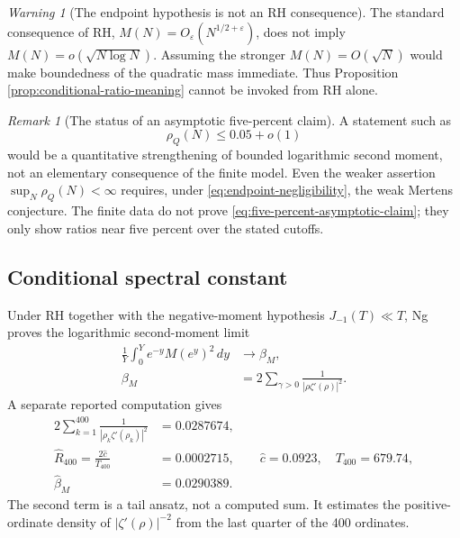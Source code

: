 \documentclass[11pt,reqno]{amsart}
\numberwithin{equation}{section}
\theoremstyle{plain}
\theoremstyle{definition}
\theoremstyle{remark}
\newtheorem{remark}[theorem]{Remark}
\newtheorem{warning}[theorem]{Warning}
\newcommand{\eps}{\varepsilon}
\begin{document}
\begin{warning}[The endpoint hypothesis is not an RH consequence]
\label{warn:endpoint-hypothesis}
The standard consequence of RH,
\(M(N)=O_{\eps}(N^{1/2+\eps})\), does not imply
\(M(N)=o(\sqrt{N\log N})\).  Assuming the stronger
\(M(N)=O(\sqrt N)\) would make boundedness of the quadratic mass immediate.
Thus Proposition \ref{prop:conditional-ratio-meaning} cannot be invoked from
RH alone.
\end{warning}

\begin{remark}[The status of an asymptotic five-percent claim]
\label{rem:always-five-percent}
A statement such as
\begin{equation}
\rho_Q(N)\leq0.05+o(1)
\label{eq:five-percent-asymptotic-claim}
\end{equation}
would be a quantitative strengthening of bounded logarithmic second moment,
not an elementary consequence of the finite model.  Even the weaker
assertion \(\sup_N\rho_Q(N)<\infty\) requires, under
\eqref{eq:endpoint-negligibility}, the weak Mertens conjecture.  The finite
data do not prove \eqref{eq:five-percent-asymptotic-claim}; they only show
ratios near five percent over the stated cutoffs.
\end{remark}

\subsection{Conditional spectral constant}
\label{subsec:spectral-constant}

Under RH together with the negative-moment hypothesis
\(J_{-1}(T)\ll T\), Ng proves the logarithmic second-moment limit
\cite{Ng2004}
\begin{align}
\frac1Y\int_0^Y e^{-y}M(e^y)^2\,dy
&\longrightarrow\beta_M,
\label{eq:ng-second-moment}\\
\beta_M
&=2\sum_{\gamma>0}\frac1{|\rho\zeta'(\rho)|^2}.
\label{eq:ng-spectral-constant}
\end{align}
A separate reported computation gives
\begin{align}
2\sum_{k=1}^{400}\frac1{|\rho_k\zeta'(\rho_k)|^2}
&=0.0287674,
\label{eq:four-hundred-zero-sum}\\
\widehat R_{400}
=\frac{2\widehat c}{T_{400}}
&=0.0002715,\qquad
\widehat c=0.0923,\quad T_{400}=679.74,
\label{eq:estimated-spectral-tail}\\
\widehat\beta_M
&=0.0290389.
\label{eq:tail-corrected-spectral-constant}
\end{align}
The second term is a tail ansatz, not a computed sum.  It estimates the
positive-ordinate density of \(|\zeta'(\rho)|^{-2}\) from the last quarter of
the 400 ordinates.
\end{document}
